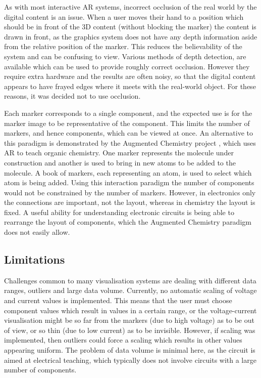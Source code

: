As with most interactive AR systems, incorrect occlusion of the real world by the digital content is an issue. When a user moves their hand to a position which should be in front of the 3D content (without blocking the marker) the content is drawn in front, as the graphics system does not have any depth information aside from the relative position of the marker. This reduces the believability of the system and can be confusing to view. Various methods of depth detection, are available which can be used to provide roughly correct occlusion. However they require extra hardware and the results are often noisy, so that the digital content appears to have frayed edges where it meets with the real-world object. For these reasons, it was decided not to use occlusion.

Each marker corresponds to a single component, and the expected use is for the marker image to be representative of the component. This limits the number of markers, and hence components, which can be viewed at once. An alternative to this paradigm is demonstrated by the Augmented Chemistry project \cite{fjeld07}, which uses AR to teach organic chemistry. One marker represents the molecule under construction and another is used to bring in new atoms to be added to the molecule. A book of markers, each representing an atom, is used to select which atom is being added. Using this interaction paradigm the number of components would not be constrained by the number of markers. However, in electronics only the connections are important, not the layout, whereas in chemistry the layout is fixed. A useful ability for understanding electronic circuits is being able to rearrange the layout of components, which the Augmented Chemistry paradigm does not easily allow.

\subsection{Limitations}

Challenges common to many visualisation systems are dealing with different data ranges, outliers and large data volume. Currently, no automatic scaling of voltage and current values is implemented. This means that the user must choose component values which result in values in a certain range, or the voltage-current visualisation might be so far from the markers (due to high voltage) as to be out of view, or so thin (due to low current) as to be invisible. However, if scaling was implemented, then outliers could force a scaling which results in other values appearing uniform. The problem of data volume is minimal here, as the circuit is aimed at electrical teaching, which typically does not involve circuits with a large number of components.

